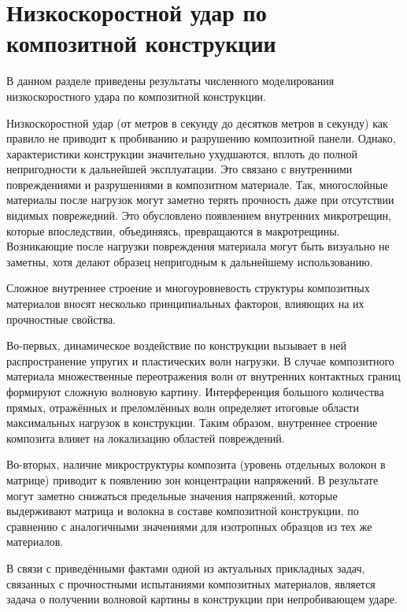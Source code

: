 \clearpage
\newpage


\section{Низкоскоростной удар по композитной конструкции}

В данном разделе приведены результаты численного моделирования низкоскоростного
удара по композитной конструкции.

Низкоскоростной удар (от метров в секунду до десятков метров в секунду) 
как правило не приводит к пробиванию и разрушению композитной панели. Однако, 
характеристики конструкции значительно ухудшаются, вплоть до полной непригодности к 
дальнейшей эксплуатации. Это связано с внутренними повреждениями и разрушениями 
в композитном материале. Так, многослойные материалы после нагрузок могут заметно 
терять прочность даже при отсутствии видимых поврежедний.
Это обусловлено появлением внутренних микротрещин, которые впоследствии, объединяясь,
превращаются в макротрещины. Возникающие после нагрузки повреждения
материала могут быть визуально не заметны, хотя делают образец непригодным к
дальнейшему использованию.

Сложное внутреннее строение и многоуровневость структуры композитных материалов вносят несколько 
принципиальных факторов, влияющих на их прочностные свойства.

Во-первых, динамическое воздействие по конструкции вызывает в ней распространение упругих и пластических волн 
нагрузки. В случае композитного материала множественные переотражения волн от внутренних контактных 
границ формируют сложную волновую картину. Интерференция большого количества 
прямых, отражённых и преломлённых волн определяет итоговые области максимальных нагрузок в конструкции. 
Таким образом, внутреннее строение композита влияет на локализацию областей повреждений.

Во-вторых, наличие микроструктуры композита (уровень отдельных волокон в матрице) приводит к появлению зон 
концентрации напряжений. В результате могут заметно снижаться предельные значения напряжений, которые 
выдерживают матрица и волокна в составе композитной конструкции, по сравнению с аналогичными значениями
для изотропных образцов из тех же материалов.

В связи с приведёнными фактами одной из актуальных прикладных задач, связанных с прочностными испытаниями 
композитных материалов, является задача о получении волновой картины в конструкции при
непробивающем ударе. 


